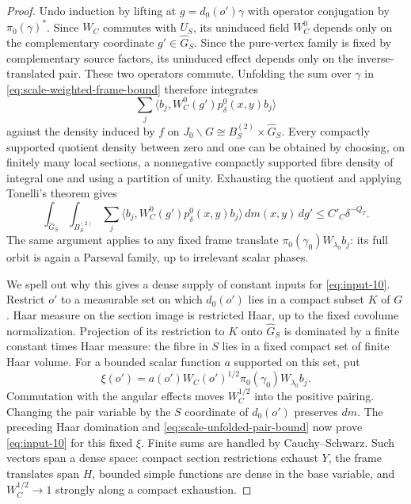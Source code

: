\begin{proof}
Undo induction by lifting at $g=d_0(o')\gamma$ with operator
conjugation by $\pi_0(\gamma)^*$.  Since $W_C$ commutes with $U_S$,
its uninduced field $W_C^0$ depends only on the complementary
coordinate $g'\in\widehat G_S$.  Since the pure-vertex family is
fixed by complementary source factors, its uninduced effect depends
only on the inverse-translated pair.  These two operators commute.
Unfolding the sum over $\gamma$ in
\eqref{eq:scale-weighted-frame-bound} therefore integrates
\[
 \sum_j\langle b_j,
 W_C^0(g')p_\delta^0(x,y)b_j\rangle
\]
against the density induced by $f$ on
$J_0\backslash G\cong B_S^{(2)}\times\widehat G_S$.
Every compactly supported quotient density between zero and one
can be obtained by choosing, on finitely many local sections, a
nonnegative compactly supported fibre density of integral one and
using a partition of unity.  Exhausting the quotient and applying
Tonelli's theorem gives
\begin{equation}
 \int_{\widehat G_S}\int_{B_S^{(2)}}
 \sum_j\langle b_j,W_C^0(g')p_\delta^0(x,y)b_j\rangle
 \,dm(x,y)\,dg'
 \le C'_C\delta^{-Q_T}.
 \label{eq:scale-unfolded-pair-bound}
\end{equation}
The same argument applies to any fixed frame translate
$\pi_0(\gamma_0)W_{\lambda_0}b_j$: its full orbit is again a
Parseval family, up to irrelevant scalar phases.

We spell out why this gives a dense supply of constant inputs for
\eqref{eq:input-10}.  Restrict $o'$ to a measurable set on which
$d_0(o')$ lies in a compact subset $K$ of $G$.  Haar measure on the
section image is restricted Haar, up to the fixed covolume
normalization.  Projection of its restriction to $K$ onto
$\widehat G_S$ is dominated by a finite constant times Haar measure:
the fibre in $S$ lies in a fixed compact set of finite Haar volume.
For a bounded scalar function $a$ supported on this set, put
\[
 \xi(o')=a(o')W_C(o')^{1/2}
             \pi_0(\gamma_0)W_{\lambda_0}b_j.
\]
Commutation with the angular effects moves $W_C^{1/2}$ into the
positive pairing.  Changing the pair variable by the $S$ coordinate
of $d_0(o')$ preserves $dm$.  The preceding Haar domination and
\eqref{eq:scale-unfolded-pair-bound} now prove
\eqref{eq:input-10} for this fixed $\xi$.  Finite sums are
handled by Cauchy--Schwarz.  Such vectors span a dense space:
compact section restrictions exhaust $Y$, the frame translates
span $H$, bounded simple functions are dense in the base variable,
and $W_C^{1/2}\to1$ strongly along a compact exhaustion.


\end{proof}
